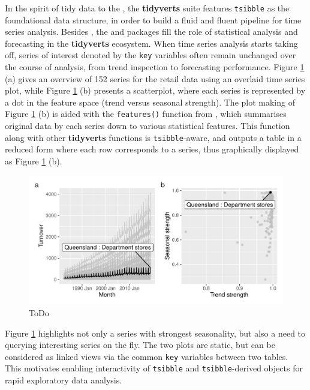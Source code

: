 In the spirit of tidy data to the 
\citep{Wickham2019}, the \textbf{tidyverts} suite features
\texttt{tsibble} as the foundational data structure, in order to build a
fluid and fluent pipeline for time series analysis. Besides
, the  and  packages
fill the role of statistical analysis and forecasting in the
\textbf{tidyverts} ecosystem. When time series analysis starts taking
off, series of interest denoted by the \texttt{key} variables often
remain unchanged over the course of analysis, from trend inspection to
forecasting performance. Figure \ref{fig:highlight-retail} (a) gives an
overview of 152 series for the retail data using an overlaid time series
plot, while Figure \ref{fig:highlight-retail} (b) presents a
scatterplot, where each series is represented by a dot in the feature
space (trend versus seasonal strength). The plot making of Figure
\ref{fig:highlight-retail} (b) is aided with the \texttt{features()}
function from , which summarises original data by each
series down to various statistical features. This function along with
other \textbf{tidyverts} functions is \texttt{tsibble}-aware, and
outputs a table in a reduced form where each row corresponds to a
series, thus graphically displayed as Figure \ref{fig:highlight-retail}
(b).

\begin{Schunk}
\begin{figure}

{\centering \includegraphics[width=\textwidth]{figure/highlight-retail-1} 

}

\caption[ToDo]{ToDo}\label{fig:highlight-retail}
\end{figure}
\end{Schunk}

Figure \ref{fig:highlight-retail} highlights not only a series with
strongest seasonality, but also a need to querying interesting series on
the fly. The two plots are static, but can be considered as linked views
via the common \texttt{key} variables between two tables. This motivates
enabling interactivity of \texttt{tsibble} and \texttt{tsibble}-derived
objects for rapid exploratory data analysis.

